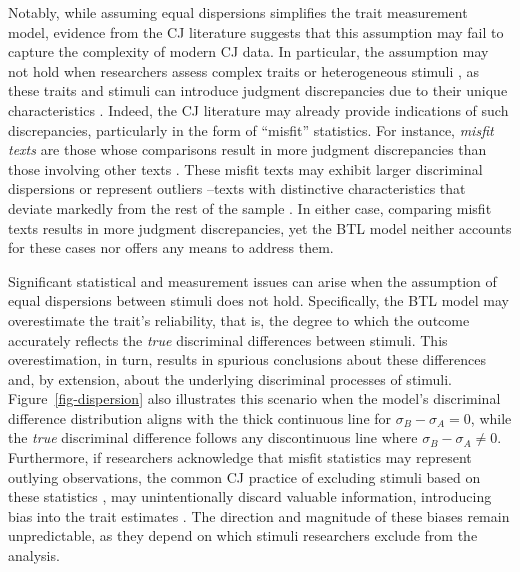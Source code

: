 \documentclass[
  authoryear,
  review,
  1p]{elsarticle}
\begin{document}
Notably, while assuming equal dispersions simplifies the trait
measurement model, evidence from the CJ literature suggests that this
assumption may fail to capture the complexity of modern CJ data. In
particular, the assumption may not hold when researchers assess complex
traits or heterogeneous stimuli
\citep{Thurstone_1927a, Bramley_2008, Kelly_et_al_2022}, as these traits
and stimuli can introduce judgment discrepancies due to their unique
characteristics
\citep{vanDaal_et_al_2016, Lesterhuis_2018, Chambers_et_al_2022}.
Indeed, the CJ literature may already provide indications of such
discrepancies, particularly in the form of ``misfit'' statistics. For
instance, \emph{misfit texts} are those whose comparisons result in more
judgment discrepancies than those involving other texts
\citep{Pollitt_2004, Pollitt_2012b, Pollitt_2012a, Goossens_et_al_2018}.
These misfit texts may exhibit larger discriminal dispersions or
represent outliers --texts with distinctive characteristics that deviate
markedly from the rest of the sample \citep{Grubbs_1969}. In either
case, comparing misfit texts results in more judgment discrepancies, yet
the BTL model neither accounts for these cases nor offers any means to
address them.

Significant statistical and measurement issues can arise when the
assumption of equal dispersions between stimuli does not hold.
Specifically, the BTL model may overestimate the trait's reliability,
that is, the degree to which the outcome accurately reflects the
\emph{true} discriminal differences between stimuli. This
overestimation, in turn, results in spurious conclusions about these
differences \citep{McElreath_2020} and, by extension, about the
underlying discriminal processes of stimuli. Figure~\ref{fig-dispersion}
also illustrates this scenario when the model's discriminal difference
distribution aligns with the thick continuous line for
\(\sigma_{B}-\sigma_{A}=0\), while the \emph{true} discriminal
difference follows any discontinuous line where
\(\sigma_{B}-\sigma_{A} \neq 0\). Furthermore, if researchers
acknowledge that misfit statistics may represent outlying observations,
the common CJ practice of excluding stimuli based on these statistics
\citep{Pollitt_2012a, Pollitt_2012b, vanDaal_et_al_2016, Goossens_et_al_2018},
may unintentionally discard valuable information, introducing bias into
the trait estimates \citep[chap.~12]{Zimmerman_1994, McElreath_2020}.
The direction and magnitude of these biases remain unpredictable, as
they depend on which stimuli researchers exclude from the analysis.
\end{document}
